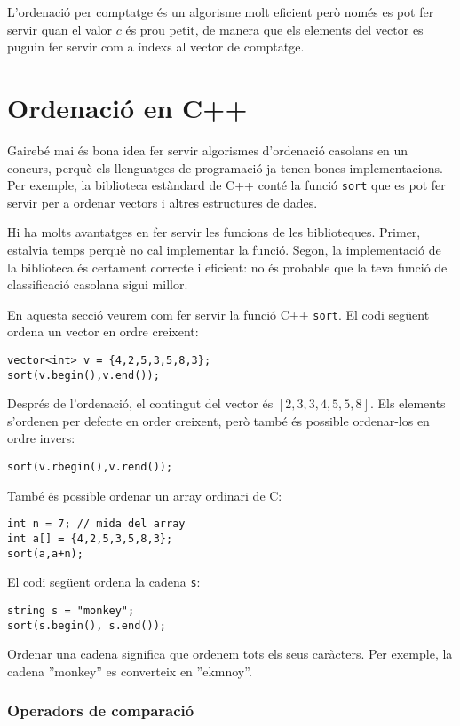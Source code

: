 L'ordenació per comptatge és un algorisme molt eficient
però només es pot fer servir quan el valor $c$
és prou petit, de manera que els elements del vector es
puguin fer servir com a índexs al vector de comptatge.

\section{Ordenació en C++}


Gairebé mai és bona idea fer servir
algorismes d'ordenació casolans
en un concurs, perquè els llenguatges de programació
ja tenen bones implementacions.
Per exemple, la biblioteca estàndard de C++ conté
la funció \texttt{sort} que es pot fer servir per a ordenar
vectors i altres estructures de dades.

Hi ha molts avantatges en fer servir les funcions de les biblioteques.
Primer, estalvia temps perquè no cal implementar la funció.
Segon, la implementació de la biblioteca és
certament correcte i eficient: no és probable
que la teva funció de classificació casolana sigui millor.

En aquesta secció veurem com fer servir la
funció C++ \texttt{sort}.
El codi següent ordena
un vector en ordre creixent:
\begin{lstlisting}
vector<int> v = {4,2,5,3,5,8,3};
sort(v.begin(),v.end());
\end{lstlisting}
Després de l'ordenació, el contingut del
vector és
$[2,3,3,4,5,5,8]$.
Els elements s'ordenen per defecte en order creixent,
però també és possible ordenar-los en ordre invers:
\begin{lstlisting}
sort(v.rbegin(),v.rend());
\end{lstlisting}
També és possible ordenar un array ordinari de C:
\begin{lstlisting}
int n = 7; // mida del array
int a[] = {4,2,5,3,5,8,3};
sort(a,a+n);
\end{lstlisting}

El codi següent ordena la cadena \texttt{s}:
\begin{lstlisting}
string s = "monkey";
sort(s.begin(), s.end());
\end{lstlisting}
Ordenar una cadena significa que ordenem tots
els seus caràcters.
Per exemple, la cadena ''monkey'' es converteix en ''ekmnoy''.

\subsubsection{Operadors de comparació}


